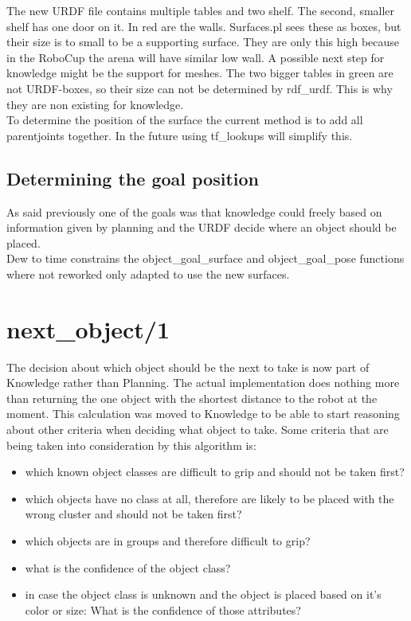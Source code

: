 \documentclass[main.tex]{subfiles}
\begin{document}
		The new URDF file contains multiple tables and two shelf. The second, smaller shelf has  one door on it. In red are the walls. Surfaces.pl sees these as boxes, but their size is to small to be a supporting surface. They are only this high because in the RoboCup the arena will have similar low wall. A possible next step for knowledge might be the support for meshes. The two bigger tables in green are not URDF-boxes, so their size can not be determined by rdf\_urdf. This is why they are non existing for knowledge.\\
		To determine the position of the surface the current method is to add all parentjoints together. In the future using tf\_lookups will  simplify this.
		
		\subsection{Determining the goal position}
		
		As said previously one of the goals was that knowledge could freely based on information given by planning and the URDF decide where an object should be placed.\\
		Dew to time constrains the object\_goal\_surface and object\_goal\_pose functions where not reworked only adapted to use the new surfaces.
		
		

		\section{next\_object/1}
		The decision about which object should be the next to take is now part of Knowledge rather than Planning. The actual implementation does nothing more than returning the one object with the shortest distance to the robot at the moment. This calculation was moved to Knowledge to be able to start reasoning about other criteria when deciding what object to take. Some criteria that are being taken into consideration by this algorithm is:
		
\begin{itemize}
\item which known object classes are difficult to grip and should not be taken first?
\item which objects have no class at all, therefore are likely to be placed with the wrong cluster and should not be taken first?
\item which objects are in groups and therefore difficult to grip?
\item what is the confidence of the object class?
\item in case the object class is unknown and the object is placed based on it's color or size: What is the confidence of those attributes?
\end{itemize}
\end{document}
